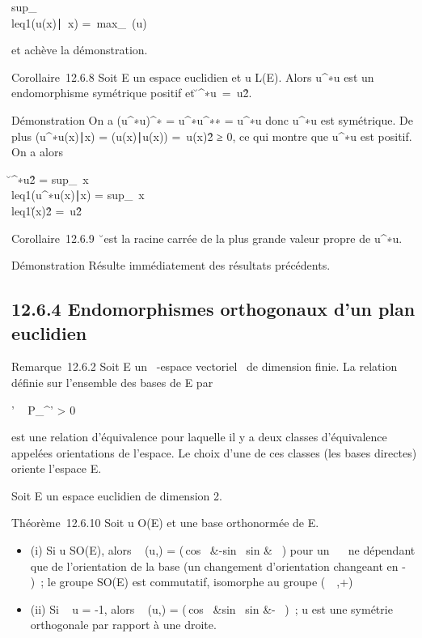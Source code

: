 \documentclass[]{article}
\begin{document}
sup_\x\\leq1(u(x)\mathrel∣~x)
=\
max_\lambda~\in{}(u)~\lambda~

et achève la démonstration.

Corollaire~12.6.8 Soit E un espace euclidien et u \in L(E). Alors
u^∗u est un endomorphisme symétrique positif et
\u^∗u\
=\ u\^2.

Démonstration On a (u^∗u)^∗ =
u^∗u^∗∗ = u^∗u donc u^∗u est
symétrique. De plus (u^∗u(x)∣x) =
(u(x)∣u(x)) =\
u(x)\^2 ≥ 0, ce qui montre que
u^∗u est positif. On a alors

\u^∗u\^2
= sup_\
x\\leq1(u^∗u(x)∣x)
= sup_\
x\\leq1\u(x)\^2
=\ u\^2

Corollaire~12.6.9 \u\
est la racine carrée de la plus grande valeur propre de u^∗u.

Démonstration Résulte immédiatement des résultats précédents.

\subsection{12.6.4 Endomorphismes orthogonaux d'un plan euclidien}

Remarque~12.6.2 Soit E un \mathbb{R}~-espace vectoriel ~de dimension finie. La
relation définie sur l'ensemble des bases de E par

'\Leftrightarrow
\mathrm{det}~
P_^' > 0

est une relation d'équivalence pour laquelle il y a deux classes
d'équivalence appelées orientations de l'espace. Le choix d'une de ces
classes (les bases directes) oriente l'espace E.

Soit E un espace euclidien de dimension 2.

Théorème~12.6.10 Soit u \in O(E) et  une base orthonormée de E.

\begin{itemize}
\itemsep1pt\parskip0pt
\item
  (i) Si u \in SO(E), alors
  \mathrmMat~ (u,\mathcal{E}) =
  \left
  (\matrix\,cos~
  \theta&-sin~ \theta\cr
  sin \theta &\cos~
  \theta\right ) pour un \theta \in {}~\pi~ ne dépendant que de
  l'orientation de la base  (un changement d'orientation changeant \theta en
  - \theta)~; le groupe SO(E) est commutatif, isomorphe au groupe (~\pi~,+)
\item
  (ii) Si \mathrm{det}~ u =
  -1, alors \mathrmMat~
  (u,\mathcal{E}) = \left
  (\matrix\,cos~
  \theta&sin~ \theta \cr
  sin \theta&-\cos~
  \theta\right )~; u est une symétrie orthogonale par
  rapport à une droite.
\end{itemize}
\end{document}
